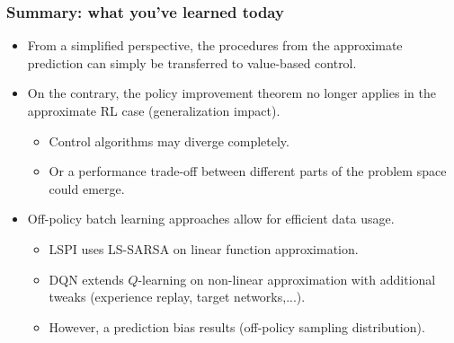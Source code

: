 \begin{frame}
  \frametitle{Summary: what you've learned today}
  \begin{itemize}
  \item From a simplified perspective, the procedures from the approximate prediction can simply be transferred to value-based control.\pause
  \item On the contrary, the policy improvement theorem no longer applies in the approximate RL case (generalization impact).\pause
    \begin{itemize}
    \item Control algorithms may diverge completely.\pause
    \item Or a performance trade-off between different parts of the problem space could emerge.\pause
    \end{itemize}
  \item Off-policy batch learning approaches allow for efficient data usage.
    \begin{itemize}
    \item LSPI uses LS-SARSA on linear function approximation.\pause
    \item DQN extends $Q$-learning on non-linear approximation with additional tweaks (experience replay, target networks,...).\pause
    \item However, a prediction bias results (off-policy sampling distribution).
    \end{itemize}
  \end{itemize}
\end{frame}
